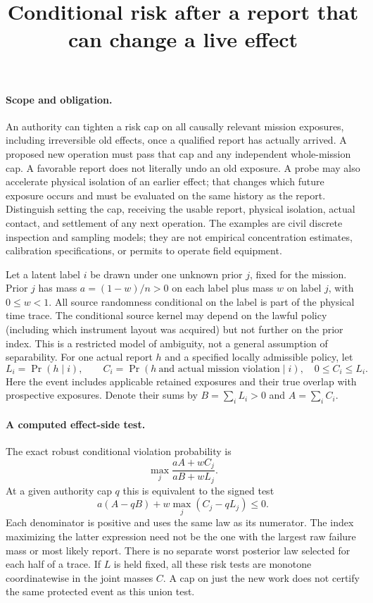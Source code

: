 \documentclass{article}
\title{Conditional risk after a report that can change a live effect}
\date{}
\begin{document}
\maketitle

\paragraph{Scope and obligation.}
An authority can tighten a risk cap on all causally relevant mission exposures, including irreversible old effects, once a qualified report has actually arrived. A proposed new operation must pass that cap and any independent whole-mission cap. A favorable report does not literally undo an old exposure. A probe may also accelerate physical isolation of an earlier effect; that changes which future exposure occurs and must be evaluated on the same history as the report. Distinguish setting the cap, receiving the usable report, physical isolation, actual contact, and settlement of any next operation. The examples are civil discrete inspection and sampling models; they are not empirical concentration estimates, calibration specifications, or permits to operate field equipment.

Let a latent label $i$ be drawn under one unknown prior $j$, fixed for the mission. Prior $j$ has mass $a=(1-w)/n>0$ on each label plus mass $w$ on label $j$, with $0\le w<1$. All source randomness conditional on the label is part of the physical time trace. The conditional source kernel may depend on the lawful policy (including which instrument layout was acquired) but not further on the prior index. This is a restricted model of ambiguity, not a general assumption of separability. For one actual report $h$ and a specified locally admissible policy, let
\[
L_i=\Pr(h\mid i),\qquad C_i=\Pr(h\ \text{and actual mission violation}\mid i),
\quad 0\le C_i\le L_i .
\]
Here the event includes applicable retained exposures and their true overlap with prospective exposures. Denote their sums by $B=\sum_i L_i>0$ and $A=\sum_i C_i$.

\paragraph{A computed effect-side test.}
The exact robust conditional violation probability is
\[
\max_j \frac{aA+w C_j}{aB+w L_j}.
\]
At a given authority cap $q$ this is equivalent to the signed test
\[
 a(A-qB)+w\max_j(C_j-q L_j)\le 0 .
\]
Each denominator is positive and uses the same law as its numerator. The index maximizing the latter expression need not be the one with the largest raw failure mass or most likely report. There is no separate worst posterior law selected for each half of a trace. If $L$ is held fixed, all these risk tests are monotone coordinatewise in the joint masses $C$. A cap on just the new work does not certify the same protected event as this union test.
\end{document}
